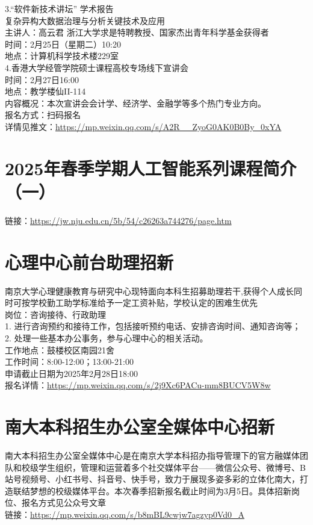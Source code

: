 \documentclass[letterpaper, 12pt]{article}
\begin{document}
\begin{multicols}{2}
3.“软件新技术讲坛” 学术报告\\
复杂异构大数据治理与分析关键技术及应用\\
主讲人：高云君 浙江大学求是特聘教授、国家杰出青年科学基金获得者\\
时间：2月25日（星期二）10:20\\
地点：计算机科学技术楼229室\\

4.香港大学经管学院硕士课程高校专场线下宣讲会\\
时间：2月27日16:00\\
地点：教学楼仙II-114 \\
内容概况：本次宣讲会会计学、经济学、金融学等多个热门专业方向。\\
报名方式：扫码报名\\
详情见推文：\url{https://mp.weixin.qq.com/s/A2R__ZyoG0AK0B0By_0xYA}

\section{2025年春季学期人工智能系列课程简介（一）}
链接：\url{https://jw.nju.edu.cn/5b/54/c26263a744276/page.htm}\\

\section{心理中心前台助理招新}
南京大学心理健康教育与研究中心现特面向本科生招募助理若干,获得个人成长同时可按学校勤工助学标准给予一定工资补贴，学校认定的困难生优先\\
岗位：咨询接待、行政助理\\
1. 进行咨询预约和接待工作，包括接听预约电话、安排咨询时间、通知咨询等；\\
2. 处理一些基本办公事务，参与心理中心的相关活动。\\
工作地点：鼓楼校区南园21舍\\
工作时间：8:00-12:00；13:00-21:00\\
申请截止日期为2025年2月28日18:00\\
报名详情：\url{https://mp.weixin.qq.com/s/2j9Xc6PACu-mm8BUCV5W8w}\\
\section{南大本科招生办公室全媒体中心招新}
南大本科招生办公室全媒体中心是在南京大学本科招办指导管理下的官方融媒体团队和校级学生组织，管理和运营着多个社交媒体平台——微信公众号、微博号、B站号视频号、小红书号、抖音号、快手号，致力于展现多姿多彩的立体化南大，打造联结梦想的校级媒体平台。本次春季招新报名截止时间为3月5日。具体招新岗位、报名方式见公众号文章\\
链接：\url{https://mp.weixin.qq.com/s/b8mBL9cwjw7agzyp0Vd0_A}\\

\end{multicols}
\end{document}
